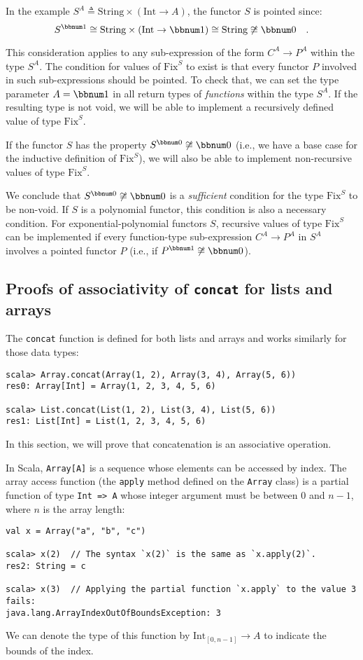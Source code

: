 In the example $S^{A}\triangleq\text{String}\times(\text{Int}\rightarrow A)$,
the functor $S$ is pointed since:
\[
S^{\bbnum 1}\cong\text{String}\times(\text{Int}\rightarrow\bbnum 1)\cong\text{String}\not\cong\bbnum 0\quad.
\]

This consideration applies to any sub-expression of the form $C^{A}\rightarrow P^{A}$
within the type $S^{A}$. The condition for values of $\text{Fix}^{S}$
to exist is that every functor $P$ involved in such sub-expressions
should be pointed. To check that, we can set the type parameter $A=\bbnum 1$
in all return types of \emph{functions} within the type $S^{A}$.
If the resulting type is not void, we will be able to implement a
recursively defined value of type $\text{Fix}^{S}$.

If the functor $S$ has the property $S^{\bbnum 0}\not\cong\bbnum 0$
(i.e., we have a base case for the inductive definition of $\text{Fix}^{S}$),
we will also be able to implement non-recursive values of type $\text{Fix}^{S}$.

We conclude that $S^{\bbnum 0}\not\cong\bbnum 0$ is a \emph{sufficient}
condition for the type $\text{Fix}^{S}$ to be non-void. If $S$ is
a polynomial functor, this condition is also a necessary condition.
For exponential-polynomial functors $S$, recursive values of type
$\text{Fix}^{S}$ can be implemented if every function-type sub-expression
$C^{A}\rightarrow P^{A}$ in $S^{A}$ involves a pointed functor $P$
(i.e., if $P^{\bbnum 1}\not\cong\bbnum 0$).

\subsection{Proofs of associativity of \texttt{concat} for lists and arrays\label{subsec:Proofs-for-associativity-law-lists-and-arrays-concat}}

The \lstinline!concat! function is defined for both lists and arrays
and works similarly for those data types:
\begin{lstlisting}
scala> Array.concat(Array(1, 2), Array(3, 4), Array(5, 6))
res0: Array[Int] = Array(1, 2, 3, 4, 5, 6)

scala> List.concat(List(1, 2), List(3, 4), List(5, 6))
res1: List[Int] = List(1, 2, 3, 4, 5, 6)
\end{lstlisting}
In this section, we will prove that concatenation is an associative
operation.

In Scala, \lstinline!Array[A]! is a sequence whose elements can be
accessed by index. The array access function (the \lstinline!apply!
method defined on the \lstinline!Array! class) is a partial function
of type \lstinline!Int => A! whose integer argument must be between
$0$ and $n-1$, where $n$ is the array length:
\begin{lstlisting}
val x = Array("a", "b", "c")

scala> x(2)  // The syntax `x(2)` is the same as `x.apply(2)`. 
res2: String = c

scala> x(3)  // Applying the partial function `x.apply` to the value 3 fails:
java.lang.ArrayIndexOutOfBoundsException: 3
\end{lstlisting}
We can denote the type of this function by $\text{Int}_{[0,n-1]}\rightarrow A$
to indicate the bounds of the index.

